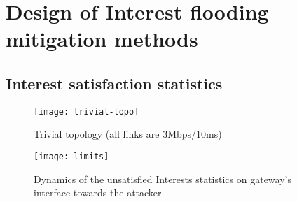 \section{Design of Interest flooding mitigation methods}
\label{sec:design}




% 


\subsection{Interest satisfaction statistics}

\begin{figure}[htbp]
  \centering
  \texttt{[image: trivial-topo]}
  \caption{Trivial topology (all links are 3Mbps/10ms)}
  \label{fig:trivial topology}
\end{figure}


\begin{figure}[htbp]
  \centering
  \texttt{[image: limits]}
  \caption{Dynamics of the unsatisfied Interests statistics on gateway's interface towards the attacker}
  \label{fig:ratio example}
\end{figure}












